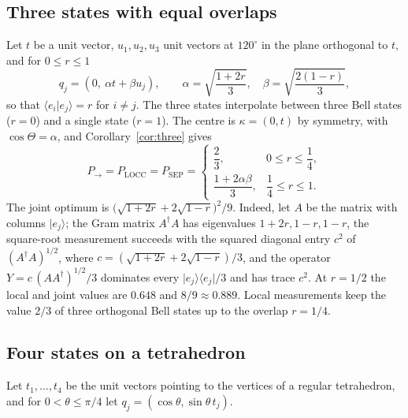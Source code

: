 \documentclass[11pt,a4paper]{article}
\theoremstyle{definition}
\theoremstyle{plain}
\newcommand{\ket}[1]{\lvert#1\rangle}
\newcommand{\bra}[1]{\langle#1\rvert}
\newcommand{\braket}[2]{\langle#1\vert#2\rangle}
\newcommand{\Pow}{P_{\to}}
\newcommand{\Psep}{P_{\mathrm{SEP}}}
\newcommand{\Plocc}{P_{\mathrm{LOCC}}}
\begin{document}
\subsection{Three states with equal overlaps}
Let $t$ be a unit vector, $u_1,u_2,u_3$ unit vectors at $120^\circ$ in the
plane orthogonal to $t$, and for $0\le r\le1$
\[
q_j=(0,\ \alpha t+\beta u_j),\qquad
\alpha=\sqrt{\frac{1+2r}{3}},\quad\beta=\sqrt{\frac{2(1-r)}{3}} ,
\]
so that $\braket{e_i}{e_j}=r$ for $i\ne j$. The three states interpolate
between three Bell states ($r=0$) and a single state ($r=1$). The centre is
$\kappa=(0,t)$ by symmetry, with $\cos\Theta=\alpha$, and
Corollary~\ref{cor:three} gives
\[
\Pow=\Plocc=\Psep=
\begin{cases}
\dfrac23,&0\le r\le\dfrac14,\\[2ex]
\dfrac{1+2\alpha\beta}{3},&\dfrac14\le r\le1 .
\end{cases}
\]
The joint optimum is $\bigl(\sqrt{1+2r}+2\sqrt{1-r}\bigr)^2/9$. Indeed, let
$A$ be the matrix with columns $\ket{e_j}$; the Gram matrix $A^\dagger A$ has
eigenvalues $1+2r,1-r,1-r$, the square-root measurement succeeds with the
squared diagonal entry $c^2$ of $(A^\dagger A)^{1/2}$, where
$c=(\sqrt{1+2r}+2\sqrt{1-r})/3$, and the operator $Y=c\,(AA^\dagger)^{1/2}/3$
dominates every $\ket{e_j}\bra{e_j}/3$ and has trace $c^2$. At $r=1/2$ the
local and joint values are $0.648$ and $8/9\approx0.889$. Local measurements keep the
value $2/3$ of three orthogonal Bell states up to the overlap $r=1/4$.

\subsection{Four states on a tetrahedron}
Let $t_1,\dots,t_4$ be the unit vectors pointing to the vertices of a regular
tetrahedron, and for $0<\theta\le\pi/4$ let
$q_j=(\cos\theta,\sin\theta\,t_j)$.
\end{document}
